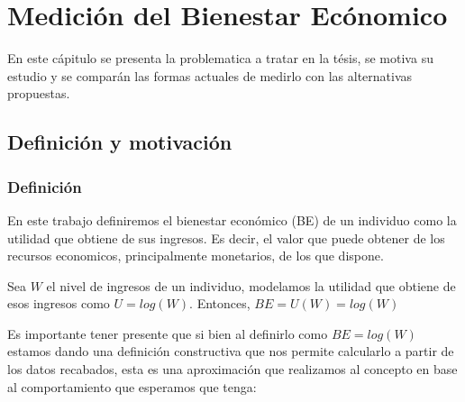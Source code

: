 \documentclass[11pt,a4paper]{tesis}
\begin{document}

\def\autor{Lautaro Lasorsa}
\def\tituloTesis{Propuesta de mejora en la medición del bienestar económico}
\def\runtitulo{Propuesta de mejora en la medición del bienestar económico}
\def\runtitle{Proporsal of improvement in the measurement of economic wellfare}
\def\director{Rodrigo Castro}
\def\codirector{Walter Sosa Escudero}
\def\lugar{Buenos Aires, Argentina, 2024}


\frontmatter
\pagestyle{empty}


\cleardoublepage

\cleardoublepage

\cleardoublepage

\cleardoublepage
\tableofcontents

\mainmatter
\pagestyle{headings}


\chapter{Medición del Bienestar Ecónomico}

En este cápitulo se presenta la problematica a tratar en la tésis, se motiva su estudio y se comparán las formas actuales de medirlo con las alternativas propuestas.

\section{Definición y motivación}

\subsection{Definición}

En este trabajo definiremos el bienestar económico (BE) de un individuo como la utilidad que obtiene de sus ingresos. Es decir, el valor que puede obtener de los recursos economicos, principalmente monetarios, de los que dispone.

Sea $W$ el nivel de ingresos de un individuo, modelamos la utilidad que obtiene de esos ingresos como $U = log(W)$. Entonces, $BE = U(W) = log(W)$

Es importante tener presente que si bien al definirlo como $BE = log(W)$ estamos dando una definición constructiva que nos permite calcularlo a partir de los datos recabados, esta es una aproximación que realizamos al concepto en base al comportamiento que esperamos que tenga:
\end{document}
